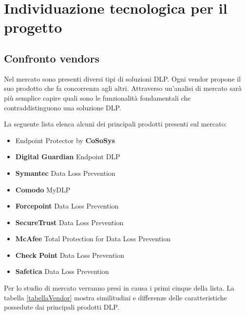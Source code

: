 \chapter{Individuazione tecnologica per il progetto}

\section{Confronto vendors}
Nel mercato sono presenti diversi tipi di soluzioni DLP. Ogni vendor propone il suo prodotto che fa 
concorrenza agli altri. Attraverso un'analisi di mercato sarà più semplice capire quali sono le funzionalità
fondamentali che contraddistinguono una soluzione DLP.

La seguente lista elenca alcuni dei principali prodotti presenti sul mercato:

\begin{itemize}
    \item Endpoint Protector by \textbf{CoSoSys}
    \item \textbf{Digital Guardian} Endpoint DLP
    \item \textbf{Symantec} Data Loss Prevention
    \item \textbf{Comodo} MyDLP
    \item \textbf{Forcepoint} Data Loss Prevention
    \item \textbf{SecureTrust} Data Loss Prevention
    \item \textbf{McAfee} Total Protection for Data Loss Prevention
    \item \textbf{Check Point} Data Loss Prevention
    \item \textbf{Safetica} Data Loss Prevention
  \end{itemize}

  Per lo studio di mercato verranno presi in causa i primi cinque della lista. 
  La tabella \ref{tabellaVendor} mostra similitudini e differenze delle caratteristiche possedute dai 
  principali prodotti DLP.

